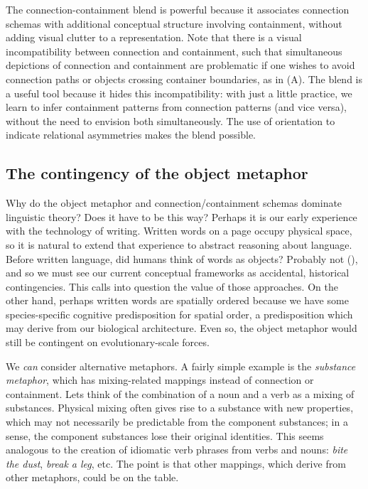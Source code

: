   The connection-containment blend is powerful because it associates connection schemas with additional conceptual structure involving containment, without adding visual clutter to a representation. Note that there is a visual incompatibility between connection and containment, such that simultaneous depictions of connection and containment are problematic if one wishes to avoid connection paths or objects crossing container boundaries, as in (A). The blend is a useful tool because it hides this incompatibility: with just a little practice, we learn to infer containment patterns from connection patterns (and vice versa), without the need to envision both simultaneously. The use of orientation to indicate relational asymmetries makes the blend possible.

\subsection{{\textbf{The contingency of the object metaphor}}}

Why do the object metaphor and connection/containment schemas dominate linguistic theory? Does it have to be this way? Perhaps it is our early experience with the technology of writing. Written words on a page occupy physical space, so it is natural to extend that experience to abstract reasoning about language. Before written language, did humans think of words as objects? Probably not (\citealt{Linell1988,Linell2005,Ong2013}), and so we must see our current conceptual frameworks as accidental, historical contingencies. This calls into question the value of those approaches. On the other hand, perhaps written words are spatially ordered because we have some species-specific cognitive predisposition for spatial order, a predisposition which may derive from our biological architecture. Even so, the object metaphor would still be contingent on evolutionary-scale forces. 

  We \textit{can} consider alternative metaphors. A fairly simple example is the \textit{substance metaphor}, which has mixing-related mappings instead of connection or containment. Lets think of the combination of a noun and a verb as a mixing of substances. Physical mixing often gives rise to a substance with new properties, which may not necessarily be predictable from the component substances; in a sense, the component substances lose their original identities. This seems analogous to the creation of idiomatic verb phrases from verbs and nouns: \textit{bite the dust}, \textit{break a leg}, etc. The point is that other mappings, which derive from other metaphors, could be on the table.

